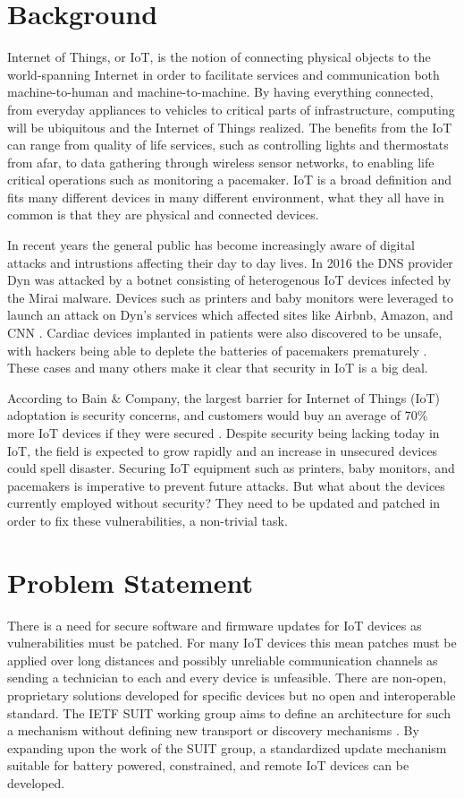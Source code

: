 \documentclass[0-thesis.tex]{subfiles}
\begin{document}
\section{Background}
Internet of Things, or IoT, is the notion of connecting physical objects to the world-spanning 
Internet in order to facilitate services and communication both machine-to-human and 
machine-to-machine. By having everything connected, from everyday appliances to vehicles to 
critical parts of infrastructure, computing will be ubiquitous and the Internet of Things 
realized. The benefits from the IoT can range from quality of life services, such as controlling 
lights and thermostats from afar, to data gathering through wireless sensor networks, to 
enabling life critical operations such as monitoring a pacemaker. IoT is a broad definition 
and fits many different devices in many different environment, what they all have in common 
is that they are physical and connected devices.

In recent years the general public has become increasingly aware of digital attacks and 
intrustions affecting their day to day lives. In 2016 the DNS provider Dyn was attacked 
by a botnet consisting of heterogenous IoT devices infected by the Mirai malware. Devices 
such as printers and baby monitors were leveraged to launch an attack on Dyn's services which 
affected sites like Airbnb, Amazon, and CNN \parencite{perlroth_2016}. Cardiac devices implanted in patients were also
discovered to be unsafe, with hackers being able to deplete the batteries of pacemakers 
prematurely \parencite{hern_2017}. These cases and many others make it clear that security in IoT is a big deal.

According to Bain \& Company, the largest barrier for Internet of Things (IoT) adoptation 
is security concerns, and customers would buy an average of 70\% more IoT devices if they 
were secured \parencite{ali_bosche_ford_2018}. Despite security being lacking today in IoT, the 
field is expected to grow rapidly and an increase in unsecured devices could spell disaster.
Securing IoT equipment such as printers, baby monitors, and pacemakers is imperative to 
prevent future attacks. But what about the devices currently employed without security? They 
need to be updated and patched in order to fix these vulnerabilities, a non-trivial task.

\section{Problem Statement}
There is a need for secure software and firmware updates for IoT devices as vulnerabilities 
must be patched. For many IoT devices this mean patches must be applied over long
distances and possibly unreliable communication channels as sending a technician to each and 
every device is unfeasible. There are non-open, proprietary solutions developed for specific
devices but no open and interoperable standard. The IETF SUIT working group aims to define an
architecture for such a mechanism without defining new transport or discovery mechanisms 
\parencite{suit}. By expanding upon the work of the SUIT group, a standardized update
mechanism suitable for battery powered, constrained, and remote IoT devices can be developed.
\end{document}
